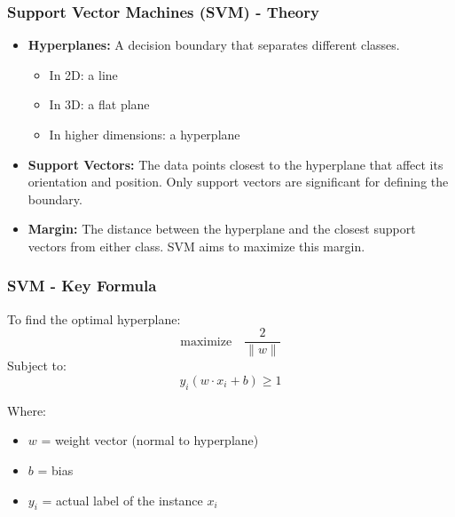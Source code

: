 \documentclass[aspectratio=169]{beamer}
\begin{document}
\begin{frame}[fragile]
    \frametitle{Support Vector Machines (SVM) - Theory}
    \begin{itemize}
        \item \textbf{Hyperplanes:} A decision boundary that separates different classes.
        \begin{itemize}
            \item In 2D: a line
            \item In 3D: a flat plane
            \item In higher dimensions: a hyperplane
        \end{itemize}
        
        \item \textbf{Support Vectors:} The data points closest to the hyperplane that affect its orientation and position. Only support vectors are significant for defining the boundary.
        
        \item \textbf{Margin:} The distance between the hyperplane and the closest support vectors from either class. SVM aims to maximize this margin.
    \end{itemize}
\end{frame}

\begin{frame}[fragile]
    \frametitle{SVM - Key Formula}
    To find the optimal hyperplane:
    \begin{equation} 
    \text{maximize} \quad \frac{2}{\lVert w \rVert} 
    \end{equation}
    Subject to:
    \begin{equation} 
    y_i(w \cdot x_i + b) \geq 1 
    \end{equation}
    
    Where:
    \begin{itemize}
        \item \( w \) = weight vector (normal to hyperplane)
        \item \( b \) = bias
        \item \( y_i \) = actual label of the instance \( x_i \)
    \end{itemize}
\end{frame}
\end{document}
